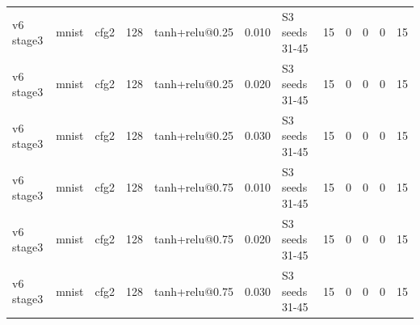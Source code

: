\begin{table}[htbp]
{\begin{tabular}{@{}lllrlrlrrrrr@{}}
v6 stage3 & mnist & cfg2 & 128 & tanh+relu@0.25 & 0.010 & S3 seeds 31-45 & 15 & 0 & 0 & 0 & 15 \\
v6 stage3 & mnist & cfg2 & 128 & tanh+relu@0.25 & 0.020 & S3 seeds 31-45 & 15 & 0 & 0 & 0 & 15 \\
v6 stage3 & mnist & cfg2 & 128 & tanh+relu@0.25 & 0.030 & S3 seeds 31-45 & 15 & 0 & 0 & 0 & 15 \\
v6 stage3 & mnist & cfg2 & 128 & tanh+relu@0.75 & 0.010 & S3 seeds 31-45 & 15 & 0 & 0 & 0 & 15 \\
v6 stage3 & mnist & cfg2 & 128 & tanh+relu@0.75 & 0.020 & S3 seeds 31-45 & 15 & 0 & 0 & 0 & 15 \\
v6 stage3 & mnist & cfg2 & 128 & tanh+relu@0.75 & 0.030 & S3 seeds 31-45 & 15 & 0 & 0 & 0 & 15 \\
\bottomrule
\end{tabular}}
\end{table}
